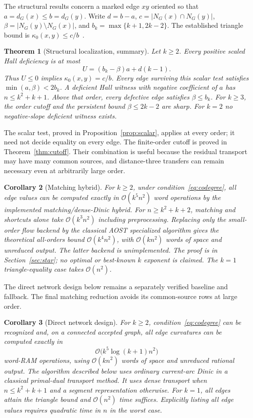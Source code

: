 \documentclass[11pt]{article}
\newtheorem{theorem}{Theorem}[section]
\newtheorem{corollary}[theorem]{Corollary}
\theoremstyle{remark}
\newcommand{\Oh}{\mathcal O}
\newcommand{\NGraph}{N_G}
\begin{document}
The structural results concern a marked edge $xy$ oriented so that $a=d_G(x)\le b=d_G(y)$. Write $d=b-a$, $c=|\NGraph(x)\cap\NGraph(y)|$, $\beta=|\NGraph(y)\setminus\NGraph(x)|$, and $b_k=\max\{k+1,2k-2\}$. The established triangle bound is $\kappa_0(x,y)\le c/b$~\cite{jostliu}.

\begin{theorem}[Structural localization, summary]\label{thm:structural}
Let $k\ge2$. Every positive scaled Hall deficiency is at most
\[
 U=(b_k-\beta)a+d(k-1).
\]
Thus $U\le0$ implies $\kappa_0(x,y)=c/b$. Every edge surviving this scalar test satisfies $\min(a,\beta)<2b_k$. A deficient Hall witness with negative coefficient of $a$ has $n\le k^2+k+1$. Above that order, every defective edge satisfies $\beta\le b_k$. For $k\ge3$, the order cutoff and the persistent bound $\beta\le2k-2$ are sharp. For $k=2$ no negative-slope deficient witness exists.
\end{theorem}

The scalar test, proved in Proposition~\ref{prop:scalar}, applies at every order; it need not decide equality on every edge. The finite-order cutoff is proved in Theorem~\ref{thm:cutoff}. Their combination is useful because the residual transport may have many common sources, and distance-three transfers can remain necessary even at arbitrarily large order.

\begin{corollary}[Matching hybrid]\label{thm:main}
For $k\ge2$, under condition~\eqref{eq:codegree}, all edge values can be computed exactly in $\Oh(k^5n^2)$ word operations by the implemented matching/dense-Dinic hybrid. For $n\ge k^2+k+2$, matching and shortcuts alone take $\Oh(k^3n^2)$ including preprocessing. Replacing only the small-order flow backend by the classical AOST specialized algorithm gives the theoretical all-orders bound $\Oh(k^4n^2)$, with $\Oh(kn^2)$ words of space and unreduced output. The latter backend is unimplemented. The proof is in Section~\ref{sec:star}; no optimal or best-known $k$ exponent is claimed. The $k=1$ triangle-equality case takes $\Oh(n^2)$.
\end{corollary}

The direct network design below remains a separately verified baseline and fallback. The final matching reduction avoids its common-source rows at large order.

\begin{corollary}[Direct network design]\label{thm:network}
For $k\ge2$, condition~\eqref{eq:codegree} can be recognized and, on a connected accepted graph, all edge curvatures can be computed exactly in
\[
 \Oh\bigl(k^5\log(k+1)n^2\bigr)
\]
word-RAM operations, using $\Oh(kn^2)$ words of space and unreduced rational output. The algorithm described below uses ordinary current-arc Dinic in a classical primal-dual transport method. It uses dense transport when $n\le k^2+k+1$ and a segment representation otherwise. For $k=1$, all edges attain the triangle bound and $\Oh(n^2)$ time suffices. Explicitly listing all edge values requires quadratic time in $n$ in the worst case.
\end{corollary}
\end{document}
